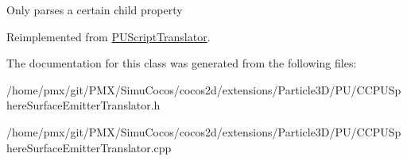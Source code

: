 Only parses a certain child property 

Reimplemented from \hyperlink{classPUScriptTranslator_a0374d83a8a04e57918975d525e0f8fe8}{P\+U\+Script\+Translator}.



The documentation for this class was generated from the following files\+:\begin{DoxyCompactItemize}
\item 
/home/pmx/git/\+P\+M\+X/\+Simu\+Cocos/cocos2d/extensions/\+Particle3\+D/\+P\+U/C\+C\+P\+U\+Sphere\+Surface\+Emitter\+Translator.\+h\item 
/home/pmx/git/\+P\+M\+X/\+Simu\+Cocos/cocos2d/extensions/\+Particle3\+D/\+P\+U/C\+C\+P\+U\+Sphere\+Surface\+Emitter\+Translator.\+cpp\end{DoxyCompactItemize}
